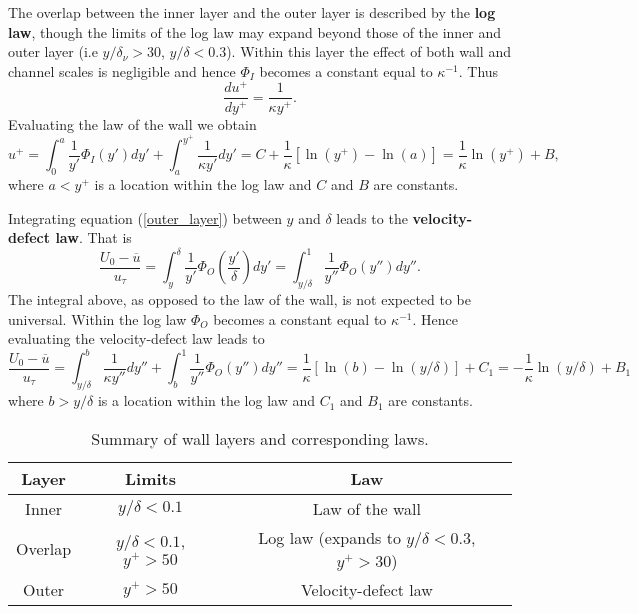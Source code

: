 \documentclass[oneside,a4paper,11pt]{report}
\newcommand{\uavg}{\overline{u}}
\begin{document}
The overlap between the inner layer and the outer layer is described by the \textbf{log law}, though the limits of the log law may expand beyond those of the inner and outer layer (i.e $y/\delta_\nu > 30$, $y/\delta < 0.3$). Within this layer the effect of both wall and channel scales is negligible and hence $\Phi_I$ becomes a constant equal to $\kappa^{-1}$. Thus
\begin{equation}
\frac{du^+}{dy^+} = \frac{1}{\kappa y^+} .
\end{equation}
Evaluating the law of the wall we obtain
\begin{equation}
u^+ = \int_0^{a} \frac{1}{y'} \Phi_I (y') dy' + \int_a^{y^+} \frac{1}{\kappa y'} dy' = C + \frac{1}{\kappa} \left [ \ln(y^+) - \ln(a) \right ] = \frac{1}{\kappa} \ln(y^+) + B,
\end{equation}
where $a < y^+$ is a location within the log law and $C$ and $B$ are constants.

Integrating equation (\ref{outer_layer}) between $y$ and $\delta$ leads to the \textbf{velocity-defect law}. That is
\begin{equation}
\frac{U_0 - \uavg}{u_\tau} = \int_y^\delta \frac{1}{y'} \Phi_O \left ( \frac{y'}{\delta} \right ) dy' = \int_{y/\delta}^1 \frac{1}{y''} \Phi_O ( y'' ) dy''.
\end{equation}
The integral above, as opposed to the law of the wall, is not expected to be universal. Within the log law $\Phi_O$ becomes a constant equal to $\kappa^{-1}$. Hence evaluating the velocity-defect law leads to
\begin{equation}
\frac{U_0 - \uavg}{u_\tau} = \int_{y/\delta}^b \frac{1}{\kappa y''} dy'' + \int_b^1 \frac{1}{y''}\Phi_O(y'')dy'' = \frac{1}{\kappa} [\ln(b) - \ln(y/\delta)] + C_1 = -\frac{1}{\kappa} \ln(y/\delta) + B_1
\end{equation}
where $b > y/\delta$ is a location within the log law and $C_1$ and $B_1$ are constants.

\begin{table}
\centering
\begin{tabular}{ | c | c | c |}
  \hline
  Layer & Limits & Law \\
  \hline
  Inner & $y/\delta < 0.1$ & Law of the wall \\
  \hline
  Overlap & $y/\delta < 0.1$, $y^+ > 50$ & Log law (expands to $y/\delta < 0.3$, $y^+>30$) \\
  \hline
  Outer & $y^+ > 50$ & Velocity-defect law\\
  \hline
\end{tabular}
\caption{Summary of wall layers and corresponding laws.}
\end{table}
\end{document}
